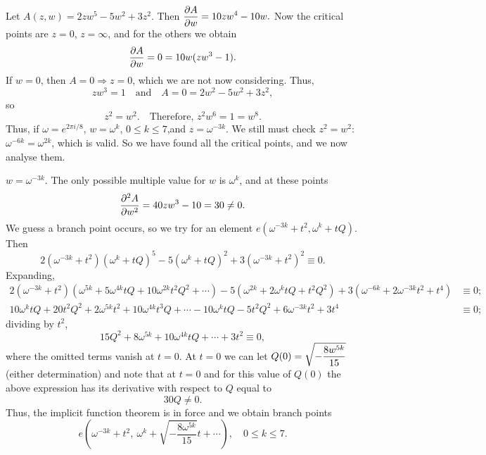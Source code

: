 \documentclass[a4paper,11pt]{article}
\begin{document}
\begin{exmp}
  Let
  $
  A(z,w) = 2zw^5 - 5w^2 + 3z^2.
  $
  Then
  $\displaystyle
  \frac{\partial A}{\partial w} = 10zw^4 - 10w.
  $
  Now the critical points are $z = 0$, $z=\infty$, and for the others
  we obtain
  $$
  \frac{\partial A}{\partial w} = 0 = 10w(zw^3-1).
  $$
  If $w = 0$, then $A=0 \Rightarrow z = 0$, which we are not now
  considering.  Thus,
  $$
  zw^3 = 1\quad\text{and}\quad A = 0 = 2w^2 - 5w^2 + 3z^2,
  $$
  so
  $$
  z^2 = w^2. \quad \text{Therefore, } z^2 w^6 = 1 = w^8.
  $$
  Thus, if $\omega = e^{2\pi i/8}$, $w = \omega^k$, $0 \le k \le
  7$,and $z = \omega^{-3k}$.  We still must check $z^2 = w^2$:
  $\omega^{-6k} = \omega^{2k}$, which is valid.  So we have found all
  the critical points, and we now analyse them.

  \underline{$w = \omega^{-3k}$}.  The only possible multiple value
  for $w$ is $\omega^k$, and at these points
  $$
  \frac{\partial^2 A}{\partial w^2} = 40 z w^3 - 10 = 30 \ne 0.
  $$
  We guess a branch point occurs, so we try for an element
  $e(\omega^{-3k} + t^2, \omega^k + tQ)$.  Then
  $$
  2(\omega^{-3k} + t^2)(\omega^k + tQ)^5 - 5(\omega^k + tQ)^2
  + 3(\omega^{-3k} + t^2)^2 \equiv 0.
  $$
  Expanding,
  $$
  \begin{aligned}
    2(\omega^{-3k} + t^2)(\omega^{5k} + 5\omega^{4k} tQ +
    10\omega^{2k} t^2 Q^2 + \cdots) - 5(\omega^{2k} + 2\omega^k tQ +
    t^2 Q^2) + 3(\omega^{-6k} + 2\omega^{-3k} t^2 + t^4) &\equiv 0;\\
    10\omega^k tQ + 20 t^2 Q^2 + 2\omega^{5k} t^2 + 10 \omega^{4k} t^3
    Q + \cdots - 10\omega^k tQ - 5t^2 Q^2 + 6\omega^{-3k} t^2 + 3t^4
    &\equiv 0;
  \end{aligned}
  $$
  dividing by $t^2$,
  $$
  15Q^2 + 8\omega^{5k} + 10\omega^{4k} tQ + \cdots + 3t^2 \equiv 0,
  $$
  where the omitted terms vanish at $t=0$.  At $t=0$ we can let $\displaystyle
  Q(0) = \sqrt{-\frac{8w^{5k}}{15}}$ (either determination) and note
  that at $t=0$ and for this value of $Q(0)$ the above expression has
  its derivative with respect to $Q$ equal to
  $$
  30Q \ne 0.
  $$
  Thus, the implicit function theorem is in force and we obtain branch
  points
  $$
  e(\omega^{-3k} + t^2,\ \omega^k + \sqrt{-\frac{8\omega^{5k}}{15}} t
  + \cdots),\quad 0 \le k \le 7.
  $$


\end{exmp}
\end{document}
